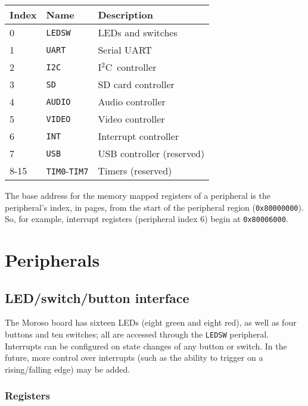 \documentclass[11pt,openany]{report}
\newcommand\iic{I$^2$C}
\begin{document}
\begin{center}
  \begin{tabular}{|l|l|l|}
    \hline
    Index & Name & Description \\
    \hline
    0 & \verb|LEDSW| & LEDs and switches \\
    \hline
    1 & \verb|UART| & Serial UART \\
    \hline
    2 & \verb|I2C| & \iic\ controller \\
    \hline
    3 & \verb|SD| & SD card controller \\
    \hline
    4 & \verb|AUDIO| & Audio controller \\
    \hline
    5 & \verb|VIDEO| & Video controller \\
    \hline
    6 & \verb|INT| & Interrupt controller \\
    \hline
    7 & \verb|USB| & USB controller (reserved) \\
    \hline
    8-15 & \verb|TIM0|-\verb|TIM7| & Timers (reserved) \\
    \hline
  \end{tabular}
\end{center}

The base address for the memory mapped registers of a peripheral
is the peripheral's index, in pages, from the start of the peripheral
region (\texttt{0x80000000}). So, for example, interrupt registers
(peripheral index 6) begin at \texttt{0x80006000}.

\chapter{Peripherals}

\section{LED/switch/button interface}
The Moroso board has sixteen LEDs (eight green and eight red), as well as four buttons
and ten switches; all are accessed through the \verb|LEDSW| peripheral. Interrupts
can be configured on state changes of any button or switch. In the future, more
control over interrupts (such as the ability to trigger on a rising/falling edge)
may be added.

\subsection{Registers}
\end{document}
